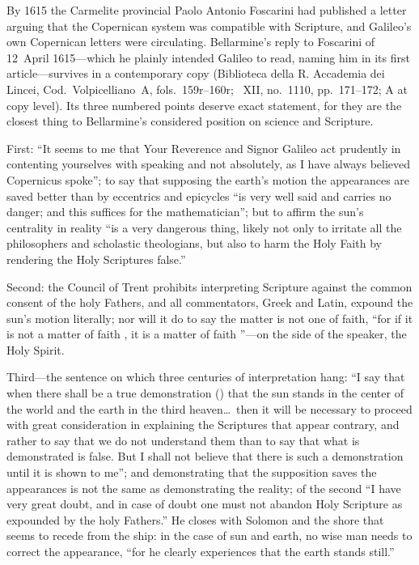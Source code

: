 By 1615 the Carmelite provincial Paolo Antonio Foscarini had
published a letter arguing that the Copernican system was
compatible with Scripture, and Galileo's own Copernican letters
were circulating. Bellarmine's reply to Foscarini of 12~April
1615---which he plainly intended Galileo to read, naming him in
its first article---survives in a contemporary copy (Biblioteca
della R. Accademia dei Lincei, Cod.\ Volpicelliano~A, fols.\
159r--160r; ~XII, no.~1110, pp.~171--172; A at copy
level). Its three numbered points deserve exact statement, for
they are the closest thing to Bellarmine's considered position on
science and Scripture.

First: ``It seems to me that Your Reverence and Signor Galileo act
prudently in contenting yourselves with speaking  and not absolutely, as I have always believed
Copernicus spoke''; to say that supposing the earth's motion the
appearances are saved better than by eccentrics and epicycles ``is
very well said and carries no danger; and this suffices for the
mathematician''; but to affirm the sun's centrality in reality
``is a very dangerous thing, likely not only to irritate all the
philosophers and scholastic theologians, but also to harm the
Holy Faith by rendering the Holy Scriptures false.''

Second: the Council of Trent prohibits interpreting Scripture
against the common consent of the holy Fathers, and all
commentators, Greek and Latin, expound the sun's motion literally;
nor will it do to say the matter is not one of faith, ``for if it
is not a matter of faith \latin{ex parte obiecti}, it is a matter
of faith \latin{ex parte dicentis}''---on the side of the speaker,
the Holy Spirit.

Third---the sentence on which three centuries of interpretation
hang: ``I say that when there shall be a true demonstration
() that the sun stands in the center of
the world and the earth in the third heaven\ldots\ then it will be
necessary to proceed with great consideration in explaining the
Scriptures that appear contrary, and rather to say that we do not
understand them than to say that what is demonstrated is false.
But I shall not believe that there is such a demonstration until
it is shown to me''; and demonstrating that the supposition saves
the appearances is not the same as demonstrating the reality; of
the second ``I have very great doubt, and in case of doubt one
must not abandon Holy Scripture as expounded by the holy
Fathers.'' He closes with Solomon and the shore that seems to
recede from the ship: in the case of sun and earth, no wise man
needs to correct the appearance, ``for he clearly experiences that
the earth stands still.''

